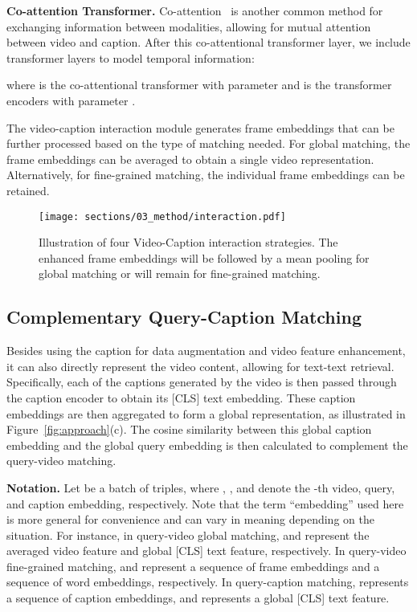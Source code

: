 \documentclass[10pt,twocolumn,letterpaper]{article}
\begin{document}
\textbf{Co-attention Transformer.} Co-attention~\cite{lu2019vilbert} is another common method for exchanging information between modalities, allowing for mutual attention between video and caption. After this co-attentional transformer layer, we include  transformer layers to model temporal information:




where  is the co-attentional transformer with parameter  and  is the transformer encoders with parameter .

The video-caption interaction module generates frame embeddings that can be further processed based on the type of matching needed. For global matching, the frame embeddings can be averaged to obtain a single video representation. Alternatively, for fine-grained matching, the individual frame embeddings can be retained.







\begin{figure}[t]
\begin{center}
\texttt{[image: sections/03\_method/interaction.pdf]}
\end{center}
\vspace{-1em}
\caption{Illustration of four Video-Caption interaction strategies. The enhanced frame embeddings will be followed by a mean pooling for global matching or will remain for fine-grained matching.}
\label{fig:interaction}
\end{figure}



\subsection{Complementary Query-Caption Matching}
Besides using the caption for data augmentation and video feature enhancement, it can also directly represent the video content, allowing for text-text retrieval. 
Specifically, each of the  captions generated by the video is then passed through the caption encoder to obtain its [CLS] text embedding. These caption embeddings are then aggregated to form a global representation, as illustrated in Figure~\ref{fig:approach}(c). The cosine similarity between this global caption embedding and the global query embedding is then calculated to complement the query-video matching.


\textbf{Notation.} Let  be a batch of  triples, where , , and  denote the -th video, query, and caption embedding, respectively. Note that the term ``embedding'' used here is more general for convenience and can vary in meaning depending on the situation. For instance, in query-video global matching,  and  represent the averaged video feature and global [CLS] text feature, respectively. In query-video fine-grained matching,  and  represent a sequence of frame embeddings and a sequence of word embeddings, respectively. In query-caption matching,  represents a sequence of caption embeddings, and  represents a global [CLS] text feature.
\end{document}
